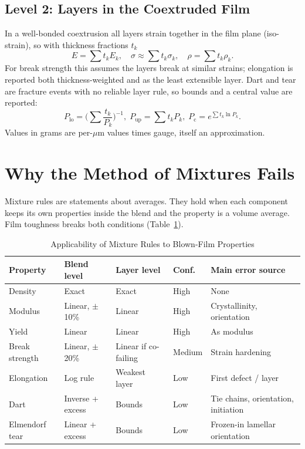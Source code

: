 \documentclass[conference,a4paper]{IEEEtran}
\begin{document}
\subsection{Level 2: Layers in the Coextruded Film}
In a well-bonded coextrusion all layers strain together in the film plane (iso-strain), so with thickness fractions $t_k$
\begin{equation}
E=\textstyle\sum t_kE_k,\quad \sigma\approx\sum t_k\sigma_k,\quad \rho=\sum t_k\rho_k. \label{eq:layer}
\end{equation}
For break strength this assumes the layers break at similar strains; elongation is reported both thickness-weighted and as the least extensible layer. Dart and tear are fracture events with no reliable layer rule, so bounds and a central value are reported:
\begin{equation}
P_{\text{lo}}=\Big(\textstyle\sum\frac{t_k}{P_k}\Big)^{-1},\; P_{\text{up}}=\sum t_kP_k,\; P_{\text{c}}=e^{\sum t_k\ln P_k}. \label{eq:bounds}
\end{equation}
Values in grams are per-$\mu$m values times gauge, itself an approximation.

\section{Why the Method of Mixtures Fails}\label{sec:fail}
Mixture rules are statements about averages. They hold when each component keeps its own properties inside the blend and the property is a volume average. Film toughness breaks both conditions (Table~\ref{tab:appl}).

\begin{table}[!t]
\caption{Applicability of Mixture Rules to Blown-Film Properties}
\label{tab:appl}\centering\footnotesize\setlength{\tabcolsep}{2.5pt}
\begin{tabular}{>{\raggedright\arraybackslash}p{1.45cm}>{\raggedright\arraybackslash}p{1.6cm}>{\raggedright\arraybackslash}p{1.6cm}>{\raggedright\arraybackslash}p{0.95cm}>{\raggedright\arraybackslash}p{1.6cm}}
\toprule
Property & Blend level & Layer level & Conf. & Main error source \\
\midrule
Density & Exact & Exact & High & None \\
Modulus & Linear, $\pm$10\% & Linear & High & Crystallinity, orientation \\
Yield & Linear & Linear & High & As modulus \\
Break strength & Linear, $\pm$20\% & Linear if co-failing & Medium & Strain hardening \\
Elongation & Log rule & Weakest layer & Low & First defect / layer \\
Dart & Inverse + excess & Bounds & Low & Tie chains, orientation, initiation \\
Elmendorf tear & Linear + excess & Bounds & Low & Frozen-in lamellar orientation \\
\bottomrule
\end{tabular}
\end{table}
\end{document}
